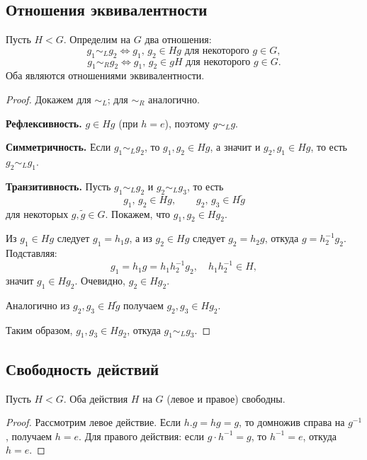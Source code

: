 \subsection*{Отношения эквивалентности}

\begin{stmt}
    Пусть $H < G$. Определим на $G$ два отношения:
    \[
        g_1 \sim_L g_2 \iff g_1,\, g_2 \in Hg \text{ для некоторого } g \in G,
    \]
    \[
        g_1 \sim_R g_2 \iff g_1,\, g_2 \in gH \text{ для некоторого } g \in G.
    \]
    Оба являются отношениями эквивалентности.

    \begin{proof}
        Докажем для $\sim_L$; для $\sim_R$ аналогично.

        \textbf{Рефлексивность.} $g \in Hg$ (при $h = e$), поэтому $g \sim_L g$.

        \textbf{Симметричность.} Если $g_1 \sim_L g_2$, то $g_1, g_2 \in Hg$, а значит и $g_2, g_1 \in Hg$,
        то есть $g_2 \sim_L g_1$.

        \textbf{Транзитивность.} Пусть $g_1 \sim_L g_2$ и $g_2 \sim_L g_3$, то есть
        \[
            g_1,\, g_2 \in Hg, \qquad g_2,\, g_3 \in H\widetilde{g}
        \]
        для некоторых $g, \widetilde{g} \in G$. Покажем, что $g_1, g_2 \in Hg_2$.

        Из $g_1 \in Hg$ следует $g_1 = h_1 g$, а из $g_2 \in Hg$ следует $g_2 = h_2 g$, откуда $g = h_2^{-1} g_2$.
        Подставляя:
        \[
            g_1 = h_1 g = h_1 h_2^{-1} g_2, \quad h_1 h_2^{-1} \in H,
        \]
        значит $g_1 \in Hg_2$. Очевидно, $g_2 \in Hg_2$.

        Аналогично из $g_2, g_3 \in H\widetilde{g}$ получаем $g_2, g_3 \in Hg_2$.

        Таким образом, $g_1, g_3 \in Hg_2$, откуда $g_1 \sim_L g_3$.
    \end{proof}
\end{stmt}

\subsection*{Свободность действий}

\begin{stmt}
    Пусть $H < G$. Оба действия $H$ на $G$ (левое и правое) свободны.

    \begin{proof}
        Рассмотрим левое действие. Если $h . g = hg = g$, то домножив справа на $g^{-1}$, получаем $h = e$.
        Для правого действия: если $g \cdot h^{-1} = g$, то $h^{-1} = e$, откуда $h = e$.
    \end{proof}
\end{stmt}

